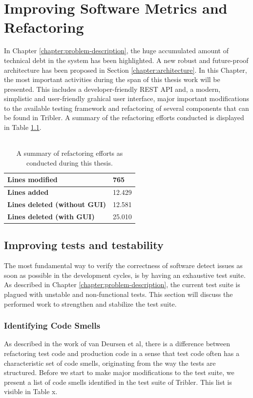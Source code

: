 \label{chapter:refactoring}
\chapter{Improving Software Metrics and Refactoring}
In Chapter \ref{chapter:problem-description}, the huge accumulated amount of technical debt in the system has been highlighted. A new robust and future-proof architecture has been proposed in Section \ref{chapter:architecture}. In this Chapter, the most important activities during the span of this thesis work will be presented. This includes a developer-friendly REST API and, a modern, simplistic and user-friendly grahical user interface, major important modifications to the available testing framework and refactoring of several components that can be found in Tribler. A summary of the refactoring efforts conducted is displayed in Table \ref{table:refactoring-summary}.\\\\

\begin{table}[h!]
	\centering
	\begin{tabular}{|l|l|}
		\hline
		\textbf{Lines modified} & 765 \\ \hline
		\textbf{Lines added} & 12.429 \\ \hline
		\textbf{Lines deleted (without GUI)} & 12.581 \\ \hline
		\textbf{Lines deleted (with GUI)} & 25.010 \\ \hline
	\end{tabular}
	\label{table:refactoring-summary}
	\caption{A summary of refactoring efforts as conducted during this thesis.}
\end{table}

\section{Improving tests and testability}
The most fundamental way to verify the correctness of software detect issues as soon as possible in the development cycles, is by having an exhaustive test suite. As described in Chapter \ref{chapter:problem-description}, the current test suite is plagued with unstable and non-functional tests. This section will discuss the performed work to strengthen and stabilize the test suite.

\subsection{Identifying Code Smells}
As described in the work of van Deursen et al\cite{van2001refactoring}, there is a difference between refactoring test code and production code in a sense that test code often has a characteristic set of code smells, originating from the way the tests are structured. Before we start to make major modifications to the test suite, we present a list of code smells identified in the test suite of Tribler. This list is visible in Table x.

